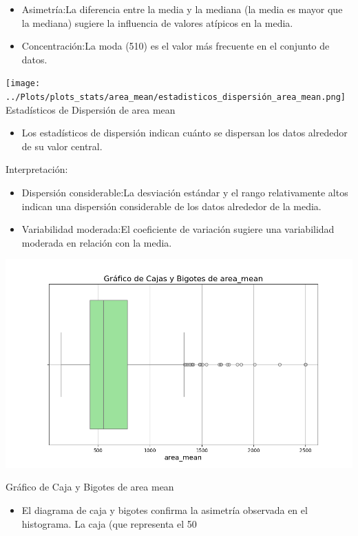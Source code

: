 \documentclass[a4paper, 12pt]{article}
\begin{document}
\begin{itemize}
\item Asimetría:La diferencia entre la media y la mediana (la media es mayor que la mediana) sugiere la influencia de valores atípicos en la media.
\item Concentración:La moda (510) es el valor más frecuente en el conjunto de datos.
\end{itemize}

\texttt{[image: ../Plots/plots\_stats/area\_mean/estadisticos\_dispersión\_area\_mean.png]}
Estadísticos de Dispersión de area mean
\begin{itemize}
\item Los estadísticos de dispersión indican cuánto se dispersan los datos alrededor de su valor central.
\end{itemize}

Interpretación:

\begin{itemize}
\item Dispersión considerable:La desviación estándar y el rango relativamente altos indican una dispersión considerable de los datos alrededor de la media.
\item Variabilidad moderada:El coeficiente de variación sugiere una variabilidad moderada en relación con la media.
\end{itemize}

\includegraphics[width=\textwidth]{../Plots/plots_stats/area_mean/boxplot_area_mean.png}

Gráfico de Caja y Bigotes de area mean
\begin{itemize}
\item El diagrama de caja y bigotes confirma la asimetría observada en el histograma. La caja (que representa el 50%
\end{itemize}
\end{document}
